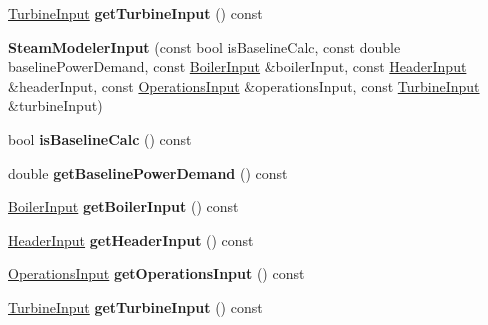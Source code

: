 \begin{DoxyCompactItemize}
\item 
\mbox{\label{class_steam_modeler_input_a75b92d1012b73e09fa4c19649661c53f}} 
\hyperlink{class_turbine_input}{Turbine\+Input} {\bfseries get\+Turbine\+Input} () const
\item 
\mbox{\label{class_steam_modeler_input_a239f096d7485171f555031289349c681}} 
{\bfseries Steam\+Modeler\+Input} (const bool is\+Baseline\+Calc, const double baseline\+Power\+Demand, const \hyperlink{class_boiler_input}{Boiler\+Input} \&boiler\+Input, const \hyperlink{class_header_input}{Header\+Input} \&header\+Input, const \hyperlink{class_operations_input}{Operations\+Input} \&operations\+Input, const \hyperlink{class_turbine_input}{Turbine\+Input} \&turbine\+Input)
\item 
\mbox{\label{class_steam_modeler_input_ac4122e6a8b606181260f2cd5e2951345}} 
bool {\bfseries is\+Baseline\+Calc} () const
\item 
\mbox{\label{class_steam_modeler_input_a42f256f493a27def4822f39dce05dd16}} 
double {\bfseries get\+Baseline\+Power\+Demand} () const
\item 
\mbox{\label{class_steam_modeler_input_a6582aa30956b3b633658bbfb6d95487f}} 
\hyperlink{class_boiler_input}{Boiler\+Input} {\bfseries get\+Boiler\+Input} () const
\item 
\mbox{\label{class_steam_modeler_input_af0850a10ee75b1f5515a4ad4439167d3}} 
\hyperlink{class_header_input}{Header\+Input} {\bfseries get\+Header\+Input} () const
\item 
\mbox{\label{class_steam_modeler_input_a913796b30c4b12838a5ddd375933e0c0}} 
\hyperlink{class_operations_input}{Operations\+Input} {\bfseries get\+Operations\+Input} () const
\item 
\mbox{\label{class_steam_modeler_input_a75b92d1012b73e09fa4c19649661c53f}} 
\hyperlink{class_turbine_input}{Turbine\+Input} {\bfseries get\+Turbine\+Input} () const
\item 
\mbox{\label{class_steam_modeler_input_a239f096d7485171f555031289349c681}} 

\end{DoxyCompactItemize}
